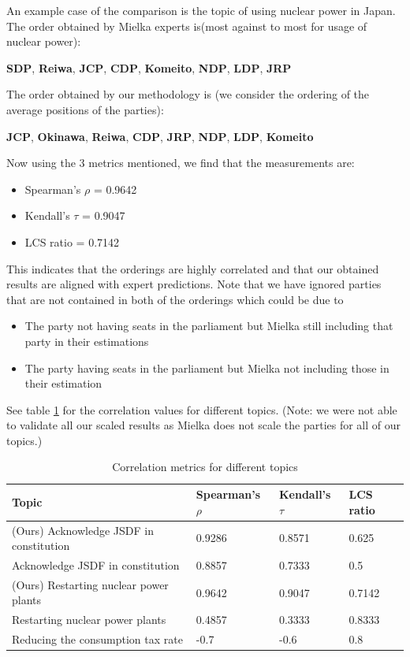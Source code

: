 \documentclass[final,5p,times,twocolumn,authoryear]{elsarticle}
\begin{document}
An example case of the comparison is the topic of using nuclear power in Japan. The order obtained by Mielka experts is(most against to most for usage of nuclear power):
\begin{center}
\textbf{SDP}, \textbf{Reiwa}, \textbf{JCP}, \textbf{CDP}, \textbf{Komeito}, \textbf{NDP}, \textbf{LDP}, \textbf{JRP}
\end{center}

The order obtained by our methodology is (we consider the ordering of the average positions of the parties):

\begin{center}
	\textbf{JCP}, \textbf{Okinawa}, \textbf{Reiwa}, \textbf{CDP}, \textbf{JRP}, \textbf{NDP}, \textbf{LDP}, \textbf{Komeito}
\end{center}

Now using the 3 metrics mentioned, we find that the measurements are:
\begin{itemize}
	\item Spearman's $\rho$ = 0.9642
	\item Kendall's $\tau$ = 0.9047
	\item LCS ratio = 0.7142
\end{itemize} 
This indicates that the orderings are highly correlated and that our obtained results are aligned with expert predictions. 
Note that we have ignored parties that are not contained in both of the orderings which could be due to 
\begin{itemize}
	\item The party not having seats in the parliament but Mielka still including that party in their estimations
	\item The party having seats in the parliament but Mielka not including those in their estimation
\end{itemize}

See table \ref{table:spearman} for the correlation values for different topics. (Note: we were not able to validate all our scaled results as Mielka does not scale the parties for all of our topics.)

\begin{table}[h]
\centering
\begin{tabularx}{\columnwidth}{|X|X|X|X|}
\hline
\textbf{Topic} & \textbf{Spearman's $\rho$}& \textbf{Kendall's $\tau$} &\textbf{LCS ratio}\\ \hline
(Ours) Acknowledge JSDF in constitution & 0.9286 & 0.8571& 0.625\\ \hline
\citep{kato2024lupinllmbasedpoliticalideology} Acknowledge JSDF in constitution & 0.8857 & 0.7333& 0.5\\ \hline
(Ours) Restarting nuclear power plants & 0.9642 & 0.9047& 0.7142\\ \hline
\citep{kato2024lupinllmbasedpoliticalideology} Restarting nuclear power plants & 0.4857 & 0.3333& 0.8333\\ \hline

Reducing the consumption tax rate & -0.7 & -0.6 & 0.8\\ \hline
\end{tabularx}
\caption{Correlation metrics for different topics}
\label{table:spearman}
\end{table}
\end{document}
